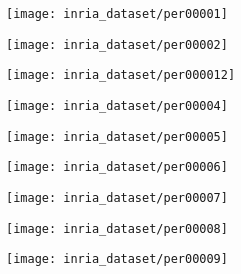 \begin{figure*}[!htbp]
  \centering

	\begin{minipage}{2.0\columnwidth}
	  \begin{minipage}{0.1\columnwidth} \centerline{\texttt{[image: inria\_dataset/per00001]}}  \end{minipage} \hfill 
	  \begin{minipage}{0.1\columnwidth} \centerline{\texttt{[image: inria\_dataset/per00002]}}  \end{minipage} \hfill 
	  \begin{minipage}{0.1\columnwidth} \centerline{\texttt{[image: inria\_dataset/per000012]}}  \end{minipage} \hfill 
	  \begin{minipage}{0.1\columnwidth} \centerline{\texttt{[image: inria\_dataset/per00004]}}  \end{minipage} \hfill 
	  \begin{minipage}{0.1\columnwidth} \centerline{\texttt{[image: inria\_dataset/per00005]}}  \end{minipage} \hfill 
	  \begin{minipage}{0.1\columnwidth} \centerline{\texttt{[image: inria\_dataset/per00006]}}  \end{minipage} \hfill 
	  \begin{minipage}{0.1\columnwidth} \centerline{\texttt{[image: inria\_dataset/per00007]}}  \end{minipage} \hfill 
	  \begin{minipage}{0.1\columnwidth} \centerline{\texttt{[image: inria\_dataset/per00008]}}  \end{minipage} \hfill 
	  \begin{minipage}{0.1\columnwidth} \centerline{\texttt{[image: inria\_dataset/per00009]}}  \end{minipage} \hfill
	\end{minipage}


\end{figure*}
